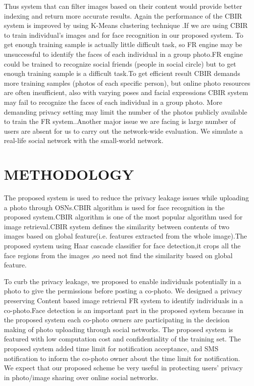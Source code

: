   \vspace*{1pc}
   Thus system that can filter images based on their content would provide better indexing and return more accurate results. Again the performance of the CBIR system is improved by using K-Means clustering technique .If we are using CBIR to train individual’s images and for face recognition in our proposed system. To get enough training sample is actually little difficult task, so FR engine may be unsuccessful to identify the faces of each individual in a group photo.FR engine could be trained to recognize social friends (people in social circle) but to get enough training sample is a difficult task.To get efficient result CBIR demands more training samples (photos of each specific person), but online photo resources are often insufficient, also with varying poses and facial expressions CBIR system may fail to recognize the faces of each individual in a group photo. More demanding privacy setting may limit the number of the photos publicly available to train the FR system..Another major issue we are facing is large number of users are absent for us to carry out the network-wide evaluation. We simulate a real-life social network with the small-world network.
 \clearpage
\chapter[METHODOLOGY]{\fontsize{16}{12}\selectfont METHODOLOGY}
\noindent
The proposed system is used to reduce the privacy leakage issues while uploading a photo through OSNs.CBIR algorithm is used for face recognition in the proposed system.CBIR algorithm is one of the most popular algorithm used for image retrieval.CBIR system  defines the similarity between contents of two images based on global feature(i.e. features extracted from the whole image).The proposed system  using Haar cascade classifier for face detection,it crops all the face regions from the images ,so need not find the similarity based on global feature.

  \vspace*{1pc}
  To curb the privacy leakage, we proposed to enable individuals potentially in a photo to give the permissions before posting a co-photo. We designed a privacy preserving Content based image retrieval FR system to identify individuals in a co-photo.Face detection is an important part in the proposed system because in the proposed system each co-photo owners are participating in the decision making of photo uploading through social networks.\vspace{1 pc} The proposed system is featured with low computation cost and confidentiality of the training set.  The proposed system added time limit for notification acceptance, and SMS notification to inform the co-photo owner about the time limit for notification. We expect that our proposed scheme be  very useful in protecting users’ privacy in photo/image sharing over online social networks.
